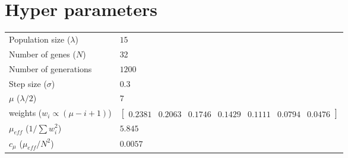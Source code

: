 \documentclass[paper=a4, fontsize=11pt]{scrartcl} %
\title{\hmwkClass \\
       \hmwkTitle}
\author{\hmwkAuthorFullName}
\date{\hmwkDueDate}
\begin{document}
    \maketitle
    \thispagestyle{fancy}

    \section{Hyper parameters}

    \begin{tabular}{ll}
        Population size ($\lambda$) & $15$ \\
        Number of genes ($N$)       & 32 \\
        Number of generations       & $1200$ \\
        Step size ($\sigma$)        & $0.3$ \\
        $\mu$ ($\lambda / 2$)       & $7$ \\
        weights ($w_i \propto (\mu - i + 1)$)
                                    & $\left[ \begin{matrix}
                                      0.2381 & 0.2063 & 0.1746 & 0.1429 & 0.1111 & 0.0794 & 0.0476
                                      \end{matrix} \right]$ \\
        $\mu_{eff}$ ($1 / \sum w_i^2$)
                                    & $5.845$ \\
        $c_\mu$ ($\mu_{eff} / N^2$) & $0.0057$ \\
    \end{tabular}
\end{document}
